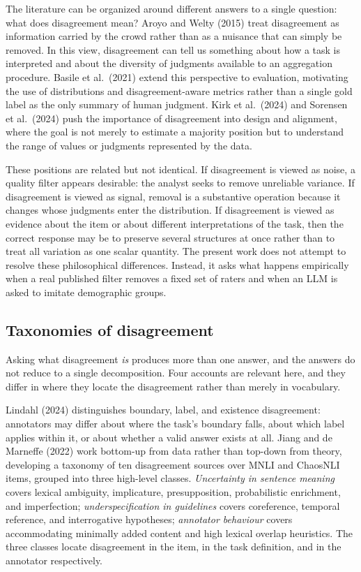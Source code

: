 \documentclass[11pt,a4paper]{article}
\begin{document}
The literature can be organized around different answers to a single question: what does
disagreement mean? Aroyo and Welty (2015) treat disagreement as
information carried by the crowd rather than as a nuisance that can simply be removed. In this
view, disagreement can tell us something about how a task is interpreted and about the diversity
of judgments available to an aggregation procedure. Basile et al.\ (2021) extend this perspective
to evaluation, motivating the use of distributions and disagreement-aware metrics rather than a
single gold label as the only summary of human judgment.
Kirk et al.\ (2024) and Sorensen et al.\ (2024) push the importance of disagreement into design
and alignment, where the goal is not merely to estimate a majority position but to understand the
range of values or judgments represented by the data.

These positions are related but not identical. If disagreement is viewed as noise, a quality
filter appears desirable: the analyst seeks to remove unreliable variance. If disagreement is
viewed as signal, removal is a substantive operation because it changes whose judgments enter the
distribution. If disagreement is viewed as evidence about the item or about different
interpretations of the task, then the correct response may be to preserve several structures at
once rather than to treat all variation as one scalar quantity. The present work does not attempt
to resolve these philosophical differences. Instead, it asks what happens empirically when a real
published filter removes a fixed set of raters and when an LLM is asked to imitate demographic
groups.

\subsection{Taxonomies of disagreement}

Asking what disagreement \emph{is} produces more than one answer, and the answers do not reduce
to a single decomposition. Four accounts are relevant here, and they differ in where they locate
the disagreement rather than merely in vocabulary.

Lindahl (2024) distinguishes boundary, label, and existence disagreement: annotators may differ
about where the task's boundary falls, about which label applies within it, or about whether a
valid answer exists at all. Jiang and de Marneffe (2022) work bottom-up from data rather than
top-down from theory, developing a taxonomy of ten disagreement sources over MNLI and ChaosNLI
items, grouped into three high-level classes. \emph{Uncertainty in sentence meaning} covers
lexical ambiguity, implicature, presupposition, probabilistic enrichment, and imperfection;
\emph{underspecification in guidelines} covers coreference, temporal reference, and interrogative
hypotheses; \emph{annotator behaviour} covers accommodating minimally added content and high
lexical overlap heuristics. The three classes locate disagreement in the item, in the task
definition, and in the annotator respectively.
\end{document}
